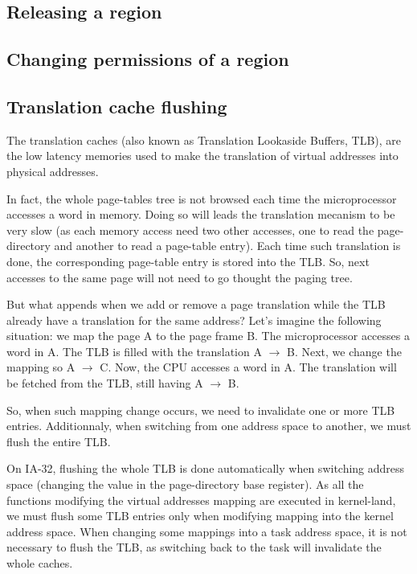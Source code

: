 %
%

\subsection{Releasing a region}

%
%

\subsection{Changing permissions of a region}

%
%

\subsection{Translation cache flushing}

The translation caches (also known as Translation Lookaside Buffers,
TLB), are the low latency memories used to make the translation of
virtual addresses into physical addresses.

In fact, the whole page-tables tree is not browsed each time the
microprocessor accesses a word in memory. Doing so will leads the
translation mecanism to be very slow (as each memory access need two
other accesses, one to read the page-directory and another to read a
page-table entry). Each time such translation is done, the
corresponding page-table entry is stored into the TLB. So, next accesses
to the same page will not need to go thought the paging tree.

But what appends when we add or remove a page translation while the TLB
already have a translation for the same address? Let's imagine the
following situation: we map the page A to the page frame B. The
microprocessor accesses a word in A. The TLB is filled with the
translation A $\rightarrow$ B. Next, we change the mapping so A
$\rightarrow$ C. Now, the CPU accesses a word in A. The translation
will be fetched from the TLB, still having A $\rightarrow$ B.

So, when such mapping change occurs, we need to invalidate one or more
TLB entries. Additionnaly, when switching from one address space to
another, we must flush the entire TLB.

On IA-32, flushing the whole TLB is done automatically when switching
address space (changing the value in the page-directory base
register). As all the functions modifying the virtual addresses
mapping are executed in kernel-land, we must flush some TLB entries
only when modifying mapping into the kernel address space. When
changing some mappings into a task address space, it is not necessary
to flush the TLB, as switching back to the task will invalidate the
whole caches.
